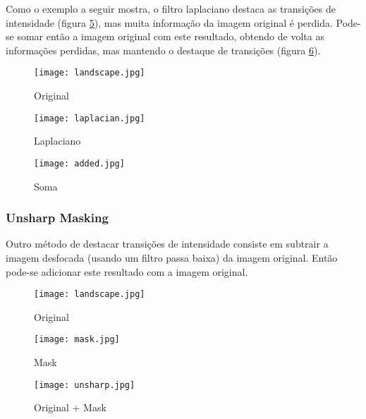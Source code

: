 \documentclass[a4paper,12pt,twoside]{article}
\begin{document}
Como o exemplo a seguir mostra, o filtro laplaciano destaca as transições de intensidade (figura \ref{lapla}), 
mas muita informação da imagem original é perdida.
Pode-se somar então a imagem original com este resultado, obtendo de volta as informações perdidas, mas mantendo o destaque de transições (figura \ref{added}).
\newpage

\begin{figure}[h]
    \begin{center}
        \texttt{[image: landscape.jpg]}
    \end{center}
    \caption{Original}\label{t2}
\end{figure}
\begin{figure}[h]
    \begin{center}
        \texttt{[image: laplacian.jpg]}
    \end{center}
    \caption{Laplaciano}\label{lapla}
\end{figure}
\begin{figure}[h]
    \begin{center}
        \texttt{[image: added.jpg]}
    \end{center}
    \caption{Soma}\label{added}
\end{figure}

\newpage
\subsubsection{Unsharp Masking}
Outro método de destacar transições de intensidade consiste em subtrair a imagem desfocada (usando um filtro passa baixa) da imagem original. 
Então pode-se adicionar este resultado com a imagem original.


\begin{figure}[h!]
    \begin{center}
        \texttt{[image: landscape.jpg]}
    \end{center}
    \caption{Original}\label{t2}
\end{figure}
\begin{figure}[h!]
    \begin{center}
        \texttt{[image: mask.jpg]}
    \end{center}
    \caption{Mask}\label{lapla}
\end{figure}
\begin{figure}[h!]
    \begin{center}
        \texttt{[image: unsharp.jpg]}
    \end{center}
    \caption{Original + Mask}\label{added}
\end{figure}
 
\end{document}
